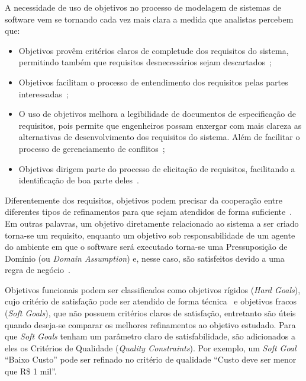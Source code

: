 A necessidade de uso de objetivos no processo de modelagem de sistemas de software vem se tornando cada vez mais clara a medida que analistas percebem que:
\begin{itemize}
	\item Objetivos provêm critérios claros de completude dos requisitos do sistema, permitindo também que requisitos desnecessários sejam descartados~\cite{van2001goal};
	
	\item Objetivos facilitam o processo de entendimento dos requisitos pelas partes interessadas~\cite{van2001goal};
	
	\item O uso de objetivos melhora a legibilidade de documentos de especificação de requisitos, pois permite que engenheiros possam enxergar com mais clareza as alternativas de desenvolvimento dos requisitos do sistema. Além de facilitar o processo de gerenciamento de conflitos~\cite{van2001goal};
	
	\item Objetivos dirigem parte do processo de elicitação de requisitos, facilitando a identificação de boa parte deles~\cite{lapouchnian2005goal}.	
\end{itemize}

Diferentemente dos requisitos, objetivos podem precisar da cooperação entre diferentes tipos de refinamentos para que sejam atendidos de forma suficiente~\cite{dardenne1993goal}. Em outras palavras, um objetivo diretamente relacionado ao sistema a ser criado torna-se um requisito, enquanto um objetivo sob responsabilidade de um agente do ambiente em que o software será executado torna-se uma Pressuposição de Domínio (ou \textit{Domain Assumption}) e, nesse caso, são satisfeitos devido a uma regra de negócio~\cite{van2001goal, van1998managing}.

Objetivos funcionais podem ser classificados como objetivos rígidos (\textit{Hard Goals}), cujo critério de satisfação pode ser atendido de forma técnica~\cite{dardenne1993goal} e objetivos fracos (\textit{Soft Goals}), que não possuem critérios claros de satisfação, entretanto são úteis quando deseja-se comparar os melhores refinamentos ao objetivo estudado. Para que \textit{Soft Goals} tenham um parâmetro claro de satisfabilidade, são adicionados a eles os Critérios de Qualidade (\textit{Quality Constraints}). Por exemplo, um \textit{Soft Goal} ``Baixo Custo'' pode ser refinado no critério de qualidade ``Custo deve ser menor que R\$ 1 mil''.

